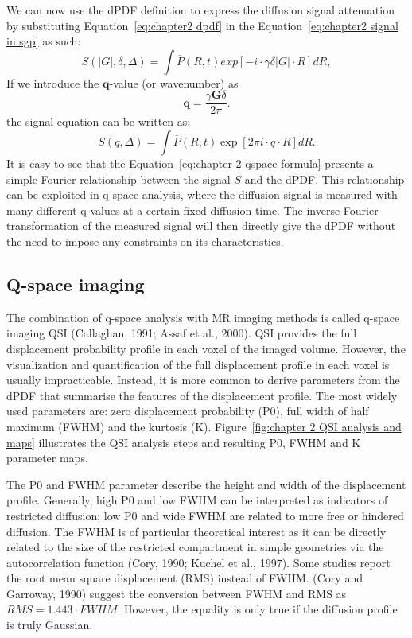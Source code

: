 We can now use the \gls{dPDF} definition to express the diffusion signal attenuation by substituting Equation~\ref{eq:chapter2 dpdf} in the Equation~\ref{eq:chapter2 signal in sgp} as such:
\begin{equation}
		S(|G|,\delta,\Delta)=\int \overline{P}(R,t) exp[-i\cdot \gamma \delta |G|\cdot R] dR,
\end{equation}
If we introduce the $\textbf{q}$-value (or wavenumber) as
 \begin{equation}
\textbf{q}=\frac{\gamma \textbf{G}\delta}{2\pi}.
\label{eq: chapter 2 q value definition}
\end{equation}
the signal equation can be written as:
\begin{equation}
		S(q,\Delta)=\int \overline{P}(R,t) \exp[2\pi i \cdot q\cdot R] dR.
\label{eq:chapter 2 qspace formula}
\end{equation}
It is easy to see that the Equation~\ref{eq:chapter 2 qspace formula} presents a simple Fourier relationship between the signal $S$ and the \gls{dPDF}. This relationship can be exploited in q-space analysis, where the diffusion signal is measured with many different q-values at a certain fixed diffusion time. The inverse Fourier transformation of the measured signal will then directly give the \gls{dPDF} without the need to impose any constraints on its characteristics.

\subsection{Q-space imaging}
\label{sec:qspace}
The combination of q-space analysis with MR imaging methods is called q-space imaging \gls{QSI} (Callaghan, 1991; Assaf et al., 2000). \gls{QSI} provides the full displacement probability profile in each voxel of the imaged volume. However, the visualization and quantification of the full displacement profile in each voxel is usually impracticable. Instead, it is more common to derive parameters from the dPDF that summarise the features of the displacement profile. The most widely used parameters are: zero displacement probability (P0), full width of half maximum (FWHM) and the kurtosis (K). Figure~\ref{fig:chapter 2 QSI analysis and maps} illustrates the QSI analysis steps and resulting P0, FWHM and K parameter maps.

The P0 and FWHM parameter describe the height and width of the displacement profile. Generally, high P0 and low FWHM can be interpreted as indicators of restricted diffusion; low P0 and wide FWHM are related to more free or hindered diffusion. The FWHM is of particular theoretical interest as it can be directly related to the size of the restricted compartment in simple geometries via the autocorrelation function (Cory, 1990; Kuchel et al., 1997). Some studies report the root mean square displacement (RMS) instead of FWHM. (Cory and Garroway, 1990) suggest the conversion between FWHM and RMS as $RMS = 1.443 \cdot FWHM$. However, the equality is only true if the diffusion profile is truly Gaussian.

